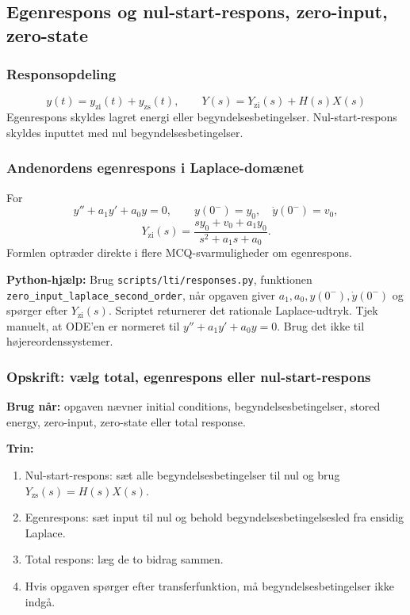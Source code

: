 \subsection{Egenrespons og nul-start-respons, zero-input, zero-state}

\subsubsection{Responsopdeling}
\[
y(t)=y_{\mathrm{zi}}(t)+y_{\mathrm{zs}}(t),\qquad
Y(s)=Y_{\mathrm{zi}}(s)+H(s)X(s)
\]
Egenrespons skyldes lagret energi eller begyndelsesbetingelser. Nul-start-respons skyldes inputtet med nul begyndelsesbetingelser.

\subsubsection{Andenordens egenrespons i Laplace-domænet}
For
\[
y''+a_1y'+a_0y=0,\qquad y(0^-)=y_0,\quad \dot y(0^-)=v_0,
\]
\[
Y_{\mathrm{zi}}(s)=\frac{s y_0+v_0+a_1y_0}{s^2+a_1s+a_0}.
\]
Formlen optræder direkte i flere MCQ-svarmuligheder om egenrespons.

\textbf{Python-hjælp:} Brug \texttt{scripts/lti/responses.py}, funktionen \texttt{zero\_input\_laplace\_second\_order}, når opgaven giver \(a_1,a_0,y(0^-),\dot y(0^-)\) og spørger efter \(Y_{\mathrm{zi}}(s)\). Scriptet returnerer det rationale Laplace-udtryk. Tjek manuelt, at ODE'en er normeret til \(y''+a_1y'+a_0y=0\). Brug det ikke til højereordenssystemer.

\subsubsection{Opskrift: vælg total, egenrespons eller nul-start-respons}
\textbf{Brug når:} opgaven nævner initial conditions, begyndelsesbetingelser, stored energy, zero-input, zero-state eller total response.

\textbf{Trin:}
\begin{enumerate}
    \item Nul-start-respons: sæt alle begyndelsesbetingelser til nul og brug \(Y_{\mathrm{zs}}(s)=H(s)X(s)\).
    \item Egenrespons: sæt input til nul og behold begyndelsesbetingelsesled fra ensidig Laplace.
    \item Total respons: læg de to bidrag sammen.
    \item Hvis opgaven spørger efter transferfunktion, må begyndelsesbetingelser ikke indgå.
\end{enumerate}


